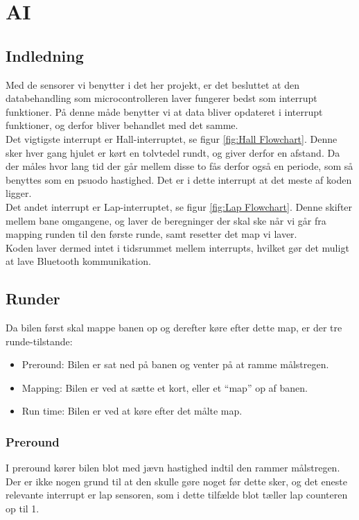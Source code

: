 \section{AI}
\label{sec:AI}

\subsection{Indledning}
Med de sensorer vi benytter i det her projekt, er det besluttet at den databehandling som microcontrolleren laver fungerer bedst som interrupt funktioner. På denne måde benytter vi at data bliver opdateret i interrupt funktioner, og derfor bliver behandlet med det samme.
\\

Det vigtigste interrupt er Hall-interruptet, se figur \ref{fig:Hall Flowchart}. Denne sker hver gang hjulet er kørt en tolvtedel rundt, og giver derfor en afstand. Da der måles hvor lang tid der går mellem disse to fås derfor også en periode, som så benyttes som en psuodo hastighed. Det er i dette interrupt at det meste af koden ligger.
\\

Det andet interrupt er Lap-interruptet, se figur \ref{fig:Lap Flowchart}. Denne skifter mellem bane omgangene, og laver de beregninger der skal ske når vi går fra mapping runden til den første runde, samt resetter det map vi laver.
\\

Koden laver dermed intet  i tidsrummet mellem interrupts, hvilket gør det muligt at lave Bluetooth kommunikation.

\subsection{Runder}

Da bilen først skal mappe banen op og derefter køre efter dette map, er der tre runde-tilstande:

\begin{itemize}
\item Preround: Bilen er sat ned på banen og venter på at ramme målstregen.
\item Mapping: Bilen er ved at sætte et kort, eller et ``map'' op af banen.
\item Run time: Bilen er ved at køre efter det målte map.
\end{itemize}

\subsubsection{Preround}
I preround kører bilen blot med jævn hastighed indtil den rammer målstregen. Der er ikke nogen grund til at den skulle gøre noget før dette sker, og det eneste relevante interrupt er lap sensoren, som i dette tilfælde blot tæller lap counteren op til 1.

